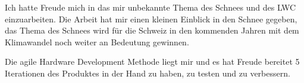 Ich hatte Freude mich in das mir unbekannte Thema des Schnees und des LWC einzuarbeiten. Die Arbeit hat mir einen kleinen Einblick in den Schnee gegeben, das Thema des Schnees wird für die Schweiz in den kommenden Jahren mit dem Klimawandel noch weiter an Bedeutung gewinnen.

Die agile Hardware Development Methode liegt mir und es hat Freude bereitet 5 Iterationen des Produktes in der Hand zu haben, zu testen und zu verbessern.
